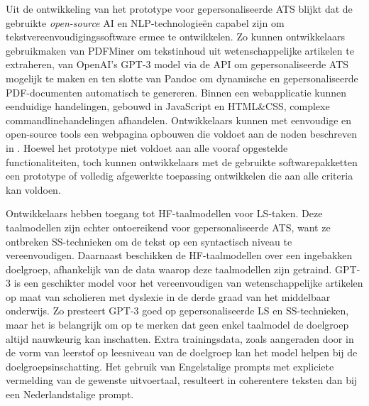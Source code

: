 \medspace

Uit de ontwikkeling van het prototype voor gepersonaliseerde ATS blijkt dat de gebruikte \textit{open-source} AI en NLP-technologieën capabel zijn om tekstvereenvoudigingssoftware ermee te ontwikkelen. Zo kunnen ontwikkelaars gebruikmaken van PDFMiner om tekstinhoud uit wetenschappelijke artikelen te extraheren, van OpenAI's GPT-3 model via de API om gepersonaliseerde ATS mogelijk te maken en ten slotte van Pandoc om dynamische en gepersonaliseerde PDF-documenten automatisch te genereren. Binnen een webapplicatie kunnen eenduidige handelingen, gebouwd in JavaScript en HTML\&CSS, complexe commandlinehandelingen afhandelen. Ontwikkelaars kunnen met eenvoudige en open-source tools een webpagina opbouwen die voldoet aan de noden beschreven in \textcite{Rello2012a}. Hoewel het prototype niet voldoet aan alle vooraf opgestelde functionaliteiten, toch kunnen ontwikkelaars met de gebruikte softwarepakketten een prototype of volledig afgewerkte toepassing ontwikkelen die aan alle criteria kan voldoen. 

\medspace

Ontwikkelaars hebben toegang tot HF-taalmodellen voor LS-taken. Deze taalmodellen zijn echter ontoereikend voor gepersonaliseerde ATS, want ze ontbreken SS-technieken om de tekst op een syntactisch niveau te vereenvoudigen. Daarnaast beschikken de HF-taalmodellen over een ingebakken doelgroep, afhankelijk van de data waarop deze taalmodellen zijn getraind. GPT-3 is een geschikter model voor het vereenvoudigen van wetenschappelijke artikelen op maat van scholieren met dyslexie in de derde graad van het middelbaar onderwijs. Zo presteert GPT-3 goed op gepersonaliseerde LS en SS-technieken, maar het is belangrijk om op te merken dat geen enkel taalmodel de doelgroep altijd nauwkeurig kan inschatten. Extra trainingsdata, zoals aangeraden door \textcite{Gooding2022} in de vorm van leerstof op leesniveau van de doelgroep kan het model helpen bij de doelgroepsinschatting. Het gebruik van Engelstalige prompts met expliciete vermelding van de gewenste uitvoertaal, resulteert in coherentere teksten dan bij een Nederlandstalige prompt.